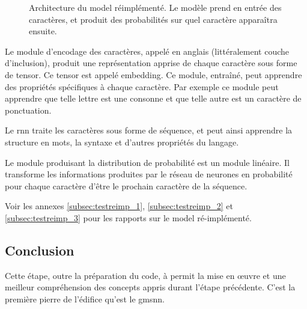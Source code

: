 \begin{figure}[h]
	\centering
	\scalebox{1}{}
	\caption[Architecture du  réimplémenté]{Architecture du \gls{model} réimplémenté. Le modèle prend en entrée des caractères, et produit des probabilités sur quel caractère apparaîtra ensuite.}\label{fig:reimplement}
\end{figure}

Le module d'encodage des caractères, appelé  en anglais (littéralement \og couche d'inclusion\fg{}), produit une représentation apprise de chaque caractère sous forme de \gls{tensor}. Ce \gls{tensor} est appelé \gls{embedding}. Ce module, entraîné, peut apprendre des propriétés spécifiques à chaque caractère. Par exemple ce module peut apprendre que telle lettre est une consonne et que telle autre est un caractère de ponctuation. \label{def:embeding}

Le \gls{rnn} traite les caractères sous forme de séquence, et peut ainsi apprendre la structure en mots, la syntaxe et d'autres propriétés du langage.

Le module produisant la distribution de probabilité est un module linéaire.
Il transforme les informations produites par le réseau de neurones en probabilité pour chaque caractère d'être le prochain caractère de la séquence. %

Voir les annexes \ref{subsec:testreimp_1}, \ref{subsec:testreimp_2} et \ref{subsec:testreimp_3} pour les rapports sur le \gls{model} ré-implémenté. 

\subsection{Conclusion}
Cette étape, outre la préparation du code, à permit la mise en œuvre et une meilleur compréhension des concepts appris durant l’étape précédente. C'est la première pierre de l'édifice qu'est le \gls{gmsnn}.